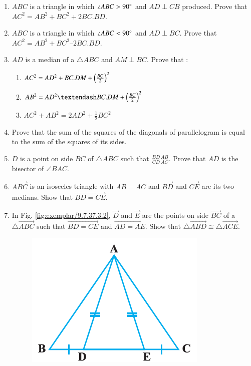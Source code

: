 \begin{enumerate}[label=\arabic*.,ref=\thesubsection.\theenumi]
\item  $ABC$ is a triangle in which  $\angle  ABC > 90\degree$ and $AD  \perp  CB$ produced. Prove that
$ AC^2= AB^2 + BC^2 + 2 BC . BD$.
\item $ABC$ is a triangle in which  $\angle  ABC < 90\degree$ and $AD  \perp  BC$. Prove that $AC^2= AB^2 + BC^2 – 2 BC . BD$.
\item $AD$ is a median of a $\triangle ABC$ and $AM  \perp  BC$. Prove that :
\begin{enumerate}
\item  $AC^2 = AD^2 + BC . DM +
\left(\frac{BC}{ 2}\right)^2$
\item  $AB^2 = AD^2 – BC . DM + \brak{\frac{BC}{ 2}}^
2 $
\item  $AC^2 + AB^2 = 2 AD^2 + \frac{1}{ 2} BC^2$
\end{enumerate}
\item Prove that the sum of the squares of the diagonals of parallelogram is equal to the sum of the squares of its sides.
\item   $D$ is a point on side $BC$ of  $\triangle  ABC$ such that
$\frac{BD}{CD} \frac{AB}{AC}  $.  Prove that $AD$ is the bisector of  $\angle  BAC$.
	\item $\vec{ABC}$ is an isosceles triangle with $\vec{AB=AC}$ and $\vec{BD}$ and $\vec{CE}$ are its two medians. Show that $\vec{BD=CE}$.
	\item In Fig. \ref{fig:exemplar/9.7.37.3.2}, $\vec{D}$ and $\vec{E}$ are the points on side $\vec{BC}$ of a $\triangle \vec{ABC}$ such that $\vec{BD=CE}$ and $\vec{AD=AE}$. Show that $\triangle \vec{ABD} \cong \triangle \vec{ACE}$.
\begin{figure}[h]
	\centering
	\includegraphics[width=\columnwidth]{chapters/exemplar/9.7.3/figs/Figure1.png}

\end{figure}
\end{enumerate}

